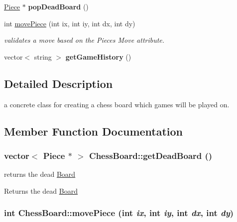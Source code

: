 \begin{DoxyCompactItemize}
\item 
\hypertarget{classChessBoard_a2cb0e5de6cef36be60fe00bd27aed712}{
\hyperlink{classPiece}{Piece} $\ast$ {\bfseries popDeadBoard} ()}
\label{classChessBoard_a2cb0e5de6cef36be60fe00bd27aed712}

\item 
int \hyperlink{classChessBoard_a1764e3d94bee2cc7a1ce6b03ae818b61}{movePiece} (int ix, int iy, int dx, int dy)
\begin{DoxyCompactList}\small\item\em validates a move based on the Pieces Move attribute. \item\end{DoxyCompactList}\item 
\hypertarget{classChessBoard_aa36755cd28d9426554ab80d0f3a337a5}{
vector$<$ string $>$ {\bfseries getGameHistory} ()}
\label{classChessBoard_aa36755cd28d9426554ab80d0f3a337a5}

\end{DoxyCompactItemize}


\subsection{Detailed Description}
a concrete class for creating a chess board which games will be played on. 

\subsection{Member Function Documentation}
\hypertarget{classChessBoard_a213f4676d46d0c938cdf4cbdf9e89fc6}{
\subsubsection[{getDeadBoard}]{\setlength{\rightskip}{0pt plus 5cm}vector$<$ {\bf Piece} $\ast$ $>$ ChessBoard::getDeadBoard ()}}
\label{classChessBoard_a213f4676d46d0c938cdf4cbdf9e89fc6}


returns the dead \hyperlink{classBoard}{Board} \begin{DoxyReturn}{Returns}
the dead \hyperlink{classBoard}{Board} 
\end{DoxyReturn}
\hypertarget{classChessBoard_a1764e3d94bee2cc7a1ce6b03ae818b61}{
\subsubsection[{movePiece}]{\setlength{\rightskip}{0pt plus 5cm}int ChessBoard::movePiece (int {\em ix}, \/  int {\em iy}, \/  int {\em dx}, \/  int {\em dy})}}
\label{classChessBoard_a1764e3d94bee2cc7a1ce6b03ae818b61}


